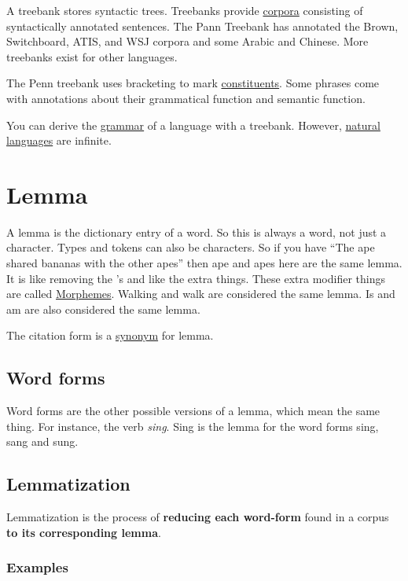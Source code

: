 \documentclass[
  11pt,
  british,
]{article}
\begin{document}
A treebank stores syntactic trees. Treebanks provide
\href{Corpus.md}{corpora} consisting of syntactically annotated
sentences. The Pann Treebank has annotated the Brown, Switchboard, ATIS,
and WSJ corpora and some Arabic and Chinese. More treebanks exist for
other languages.

The Penn treebank uses bracketing to mark
\href{../Languages/Constituency.md}{constituents}. Some phrases come
with annotations about their grammatical function and semantic function.

You can derive the \href{../Languages/Grammar.md}{grammar} of a language
with a treebank. However,
\href{../Languages/Natural\%20languages.md}{natural languages} are
infinite.

\hypertarget{lemma}{%
\section{Lemma}\label{lemma}}

A lemma is the dictionary entry of a word. So this is always a word, not
just a character. Types and tokens can also be characters. So if you
have ``The ape shared bananas with the other apes'' then ape and apes
here are the same lemma. It is like removing the 's and like the extra
things. These extra modifier things are called
\href{Morphemes.md}{Morphemes}. Walking and walk are considered the same
lemma. Is and am are also considered the same lemma.

The citation form is a \href{../Languages/Synonyms.md}{synonym} for
lemma.

\hypertarget{word-forms}{%
\subsection{Word forms}\label{word-forms}}

Word forms are the other possible versions of a lemma, which mean the
same thing. For instance, the verb \emph{sing}. Sing is the lemma for
the word forms sing, sang and sung.

\hypertarget{lemmatization}{%
\subsection{Lemmatization}\label{lemmatization}}

Lemmatization is the process of \textbf{reducing each word-form} found
in a corpus \textbf{to its corresponding lemma}.

\hypertarget{examples}{%
\subsubsection{Examples}\label{examples}}
\end{document}
